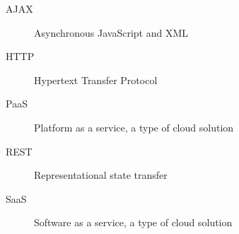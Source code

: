 \documentclass[]{tukethesis}
\begin{document}

\listofterms %

\begin{description}
\item[AJAX] Asynchronous JavaScript and XML
\item[HTTP] Hypertext Transfer Protocol
\item[PaaS] Platform as a service, a type of cloud solution
\item[REST] Representational state transfer
\item[SaaS] Software as a service, a type of cloud solution
\end{description}

\setlength{\parindent}{1cm} 
\setlength{\parskip}{0cm}

\endlistofterms
%

%














%
%
%
%
%






%
\end{document}
